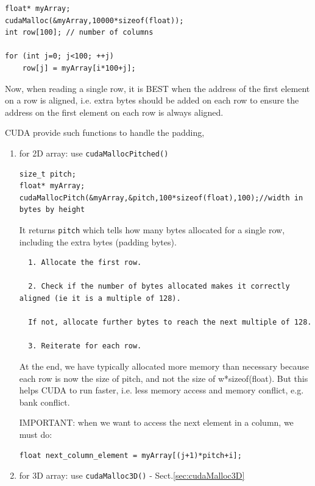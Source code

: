 \begin{verbatim}
float* myArray;
cudaMalloc(&myArray,10000*sizeof(float));
int row[100]; // number of columns

for (int j=0; j<100; ++j)
    row[j] = myArray[i*100+j];
\end{verbatim}

Now, when reading a single row, it is BEST when the address of the first element
on a row is aligned, i.e. extra bytes should be added on each row to ensure the
address on the first element on each row is always aligned.

CUDA provide such functions to handle the padding, 
\begin{enumerate}
  \item for 2D array: use \verb!cudaMallocPitched()!
  
\begin{lstlisting}
size_t pitch;
float* myArray;
cudaMallocPitch(&myArray,&pitch,100*sizeof(float),100);//width in bytes by height
\end{lstlisting}  

It returns \verb!pitch! which tells how many bytes allocated for a single row,
including the extra bytes (padding bytes).


  \begin{verbatim}
  1. Allocate the first row.
  
  2. Check if the number of bytes allocated makes it correctly aligned (ie it is a multiple of 128).
  
  If not, allocate further bytes to reach the next multiple of 128. 
  
  3. Reiterate for each row.
  \end{verbatim}
  
At the end, we have typically allocated more memory than necessary because each
row is now the size of pitch, and not the size of w*sizeof(float).
But this helps CUDA to run faster, i.e. less memory access and memory conflict,
e.g. bank conflict.

IMPORTANT: when we want to access the next element in a column, we must do:
\begin{lstlisting}
float next_column_element = myArray[(j+1)*pitch+i];
\end{lstlisting}

  
  \item for 3D array: use  \verb!cudaMalloc3D()! - Sect.\ref{sec:cudaMalloc3D}
  
\end{enumerate}

